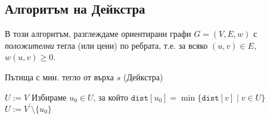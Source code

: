 



\subsection{Алгоритъм на Дейкстра}

В този алгоритъм, разглеждаме ориентирани графи $G = (V,E,w)$ с {\em положителни} тегла (или цени) по ребрата, т.е. 
за всяко $(u,v) \in E$, $w(u,v) \geq 0$.

\begin{algorithm}[H]
  \caption{Пътища с мин. тегло от върха $s$ (Дейкстра)}
  \label{alg:dijkstra}
  
  \begin{algorithmic}[1]
    \State {}
    \State $U := V$
    \State Избираме $u_0\in U$, за който $\texttt{dist}[u_0] = \min\{\texttt{dist}[v] \mid v\in U\} $
    \State $U := V^\prime\setminus\{u_0\}$
    \State{}
    \EndFor
    \EndWhile
    \EndProcedure
  \end{algorithmic}
\end{algorithm}

